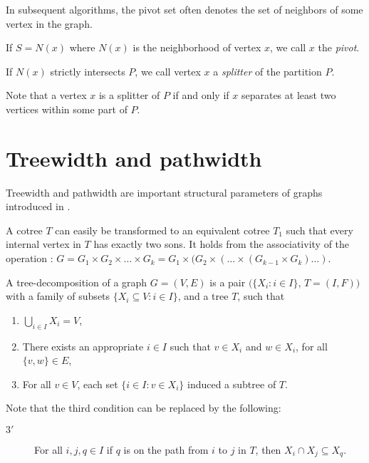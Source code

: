 In subsequent algorithms, the pivot set often denotes the set of neighbors of some vertex in the graph.
\begin{notation}[Pivot]
    If $S=N(x)$ where $N(x)$ is the neighborhood of vertex $x$, we call $x$ the \emph{pivot}.
\end{notation}

\begin{notation}[Splitter]
    If $N(x)$ strictly intersects $P$, we call vertex $x$ a \emph{splitter} of the partition $P$.
\end{notation}
 Note that a vertex $x$ is a splitter of $P$ if and only if $x$ separates at least two vertices within some part of $P$.

\section{Treewidth and pathwidth}
Treewidth and pathwidth are important structural parameters of graphs introduced in \cite{ROBERTSON1986309}.

A cotree $T$ can easily be transformed to an equivalent cotree $T_1$ such that every internal vertex in $T$ has exactly two sons. 
It holds from the associativity of the operation : $G=G_1 \times G_2 \times \dots \times G_k=G_1 \times (G_2 \times ( \dots \times(G_{k-1} \times G_{k} )\dots)$.


\begin{definition}
    A tree-decomposition of a graph $G=(V,E)$ is a pair $(\{ X_i \colon i \in I\}$, $T=(I,F))$ with a family of subsets $\{ X_i \subseteq V \colon i \in I\}$, and a tree $T$, such that 
\begin{enumerate}
    \item $ \bigcup\limits_{i\in I} X_i=V$,
    \item There exists an appropriate $i \in I$ such that $v \in X_i $ and $w \in X_i$, for all $\{v,w\} \in E$,
    \item For all $v \in V$, each set $\{i \in I \colon v \in X_i \}$ induced a subtree of $T$.
\end{enumerate}
\end{definition}
Note that the third condition can be replaced by the following:
\begin{description}
    \item[$3'$]  For all $i, j, q \in I$ if $q$ is on the path from $i$ to $j$ in $T$, then $X_i \cap X_j \subseteq X_q$.
\end{description}



